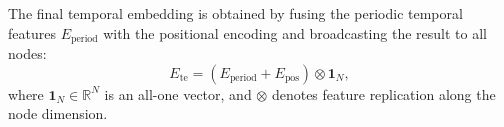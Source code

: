 \documentclass[5p,times,authoryear]{elsarticle}
\begin{document}
The final temporal embedding is obtained by fusing the periodic temporal features $E_{\mathrm{period}}$ with the positional encoding and broadcasting the result to all nodes:
\vspace{-3pt}
\begin{equation}
E_{\mathrm{te}}
= \left( E_{\mathrm{period}} + E_{\mathrm{pos}} \right) \otimes \mathbf{1}_N,
\label{eq:temporal_broadcast}
\end{equation}
\vspace{-3pt}
where $\mathbf{1}_N \in \mathbb{R}^{N}$ is an all-one vector, and $\otimes$ denotes feature replication along the node dimension.

\end{document}
